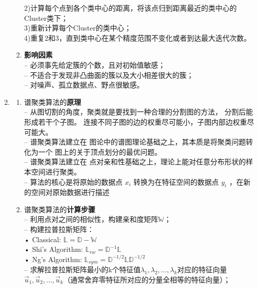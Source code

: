 \documentclass[a4paper,11pt,onecolumn,oneside,UTF8]{article}
\begin{document}
\begin{enumerate}
\begin{enumerate}[(1)]
                        2)计算每个点到各个类中心的距离，将该点归到距离最近的类中心的Cluster类下；\\
                        3)重新计算每个Cluster的类中心；\\
                        4)重复2和3，直到类中心在某个精度范围不变化或者到达最大迭代次数。
                  \item \textbf{影响因素}\\
                        – 必须事先给定簇的个数，且对初始值敏感；\\
                        – 不适合于发现非凸曲面的簇以及大小相差很大的簇；\\
                        – 对噪声、孤立数据点、野点很敏感。
            \end{enumerate}
      \item
            \begin{enumerate}[(1)]
                  \item 谱聚类算法的\textbf{原理}\\
                        – 从图切割的角度，聚类就是要找到一种合理的分割图的方法， 分割后能形成若干个子图。
                        连接不同子图的边的权重尽可能小，子图内部边权重尽可能大。\\
                        – 谱聚类算法建立在 图论中的谱图理论基础之上，其本质是将聚类问题转化为一个
                        图上的关于顶点划分的最优问题。\\
                        – 谱聚类算法建立在 点对亲和性基础之上，理论上能对任意分布形状的样本空间进行聚类。\\
                        – 算法的核心是将原始的数据点 $x_i$ 转换为在特征空间的数据点 $y_i$ ，在新的空间对原始数据进行描述
                  \item 谱聚类算法的\textbf{计算步骤}\\
                        – 利用点对之间的相似性，构建亲和度矩阵$\mathbb{W}$；\\
                        – 构建拉普拉斯矩阵：\\
                        \quad • Classical: $\mathbb{L} = \mathbb{D}-\mathbb{W}$\\
                        \quad • Shi's Algorithm: $\mathbb{L}_{rw} = \mathbb{D}^{-1}\mathbb{L}$\\
                        \quad • Ng's Algorithm: $\mathbb{L}_{sym} = \mathbb{D}^{-1/2}\mathbb{L}\mathbb{D}^{-1/2}$\\
                        – 求解拉普拉斯矩阵最小的k个特征值{$\lambda_1,\lambda_2,...,\lambda_k$}对应的特征向量{$\vec{u}_1,\vec{u}_2,...,\vec{u}_k$}（通常舍弃零特征所对应的分量全相等的特征向量）；\\

\end{enumerate}
\end{enumerate}
\end{document}
